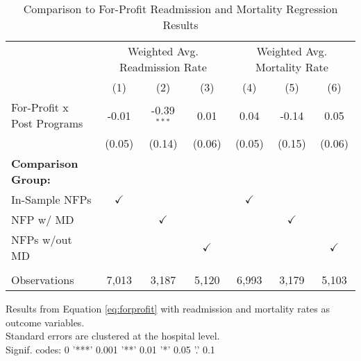 \begin{table}[ht!]
   \caption{\label{tab:forprofit_readmort_fullsample} Comparison to For-Profit Readmission and Mortality Regression Results}
   \bigskip
   \centering
   \begin{tabular}{lcccccc}
      \toprule
       & \multicolumn{3}{c}{Weighted Avg. Readmission Rate} & \multicolumn{3}{c}{Weighted Avg. Mortality Rate}\\
                                  & (1)           & (2)           & (3)           & (4)           & (5)           & (6)\\  
      \midrule 
      For-Profit x Post Programs  & -0.01         & -0.39$^{***}$ & 0.01          & 0.04          & -0.14         & 0.05\\   
                                  & (0.05)        & (0.14)        & (0.06)        & (0.05)        & (0.15)        & (0.06)\\   
      \textbf{Comparison Group:}  &               &               &               &               &               & \\  
      In-Sample NFPs              & $\checkmark$  &               &               & $\checkmark$  &               & \\  
      NFP w/ MD                   &               & $\checkmark$  &               &               & $\checkmark$  & \\  
      NFPs w/out MD               &               &               & $\checkmark$  &               &               & $\checkmark$\\   
       \\
      Observations                & 7,013         & 3,187         & 5,120         & 6,993         & 3,179         & 5,103\\  
      \bottomrule
   \end{tabular}
   
   \par \raggedright 
   Results from Equation \ref{eq:forprofit} with readmission and mortality rates as outcome variables.\\
   Standard errors are clustered at the hospital level.\\
   Signif. codes: 0 '***' 0.001 '**' 0.01 '*' 0.05 '.' 0.1
\end{table}
